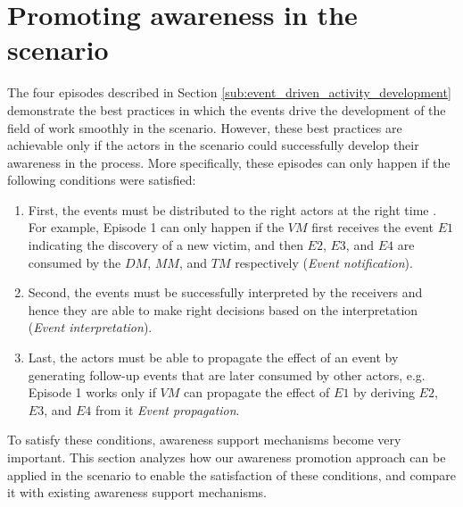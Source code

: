 \section{Promoting awareness in the scenario} %
\label{sec:promoting_awareness_in_the_scenario}
The four episodes described in Section \ref{sub:event_driven_activity_development} demonstrate the best practices in which the events drive the development of the field of work smoothly in the scenario. However, these best practices are achievable only if the actors in the scenario could successfully develop their awareness in the process. More specifically, these episodes can only happen if the following conditions were satisfied:

\begin{enumerate}
	\item First, the events must be distributed to the right actors at the right time . For example, Episode 1 can only happen if the $VM$ first receives the event $E1$ indicating the discovery of a new victim, and then $E2$, $E3$, and $E4$ are consumed by the $DM$, $MM$, and $TM$ respectively (\emph{Event notification}).
	\item Second, the events must be successfully interpreted by the receivers and hence they are able to make right decisions based on the interpretation (\emph{Event interpretation}). 
	\item Last, the actors must be able to propagate the effect of an event by generating follow-up events that are later consumed by other actors, e.g. Episode 1 works only if $VM$ can propagate the effect of $E1$ by deriving $E2$, $E3$, and $E4$ from it \emph{Event propagation}.
\end{enumerate}

To satisfy these conditions, awareness support mechanisms become very important. This section analyzes how our awareness promotion approach can be applied in the scenario to enable the satisfaction of these conditions, and compare it with existing awareness support mechanisms.

